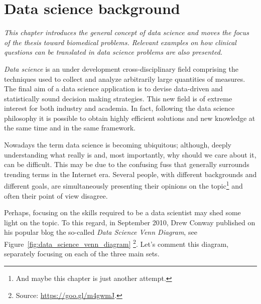 
\chapter{Data science background} \label{chap:background}

\begin{displayquote}
	\textit{This chapter introduces the general concept of data science and moves the focus of the thesis toward biomedical problems. Relevant examples on how clinical questions can be translated in data science problems are also presented.}
\end{displayquote}

\textit{Data science} is an under development cross-disciplinary field comprising the techniques used to collect and analyze arbitrarily large quantities of measures. The final aim of a data science application is to devise data-driven and statistically sound decision making strategies.
This new field is of extreme interest for both industry and academia. In fact, following the data science philosophy it is possible to obtain highly efficient solutions and new knowledge at the same time and in the same framework.

Nowadays the term data science is becoming ubiquitous; although, deeply understanding what really is and, most importantly, why should we care about it, can be difficult.
This may be due to the confusing fuss that generally surrounds trending terms in the Internet era. Several people, with different backgrounds and different goals, are simultaneously presenting their opinions on the topic\footnote{ And maybe this chapter is just another attempt.} and often their point of view disagree.

Perhaps, focusing on the skills required to be a data scientist may shed some light on the topic. To this regard, in September 2010, Drew Conway published on his popular blog the so-called \textit{Data Science Venn Diagram}, see Figure~\ref{fig:data_science_venn_diagram} \footnote{ Source: \url{https://goo.gl/m4gwmJ}.}.
Let's comment this diagram, separately focusing on each of the three main sets.

